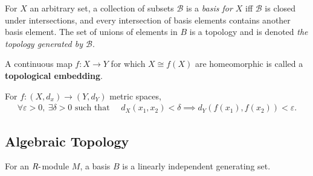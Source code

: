 \begin{definition}

For \(X\) an arbitrary set, a collection of subsets \({\mathcal{B}}\) is
a \emph{basis for \(X\)} iff \({\mathcal{B}}\) is closed under
intersections, and every intersection of basis elements contains another
basis element. The set of unions of elements in \(B\) is a topology and
is denoted \emph{the topology generated by \({\mathcal{B}}\)}.

\end{definition}

\begin{definition}

A continuous map \(f:X \to Y\) for which \(X\cong f(X)\) are
homeomorphic is called a \textbf{topological embedding}.

\end{definition}

\begin{definition}

For \(f: (X, d_{x}) \to (Y, d_{Y})\) metric spaces,
\begin{align*}
\forall \varepsilon> 0, ~\exists \delta > 0 \text{ such that } \quad d_{X}(x_{1}, x_{2}) < \delta \implies d_{Y}(f(x_{1}), f(x_{2})) < \varepsilon
.\end{align*}

\end{definition}

\hypertarget{algebraic-topology}{%
\subsection{Algebraic Topology}\label{algebraic-topology}}

\begin{definition}[Acyclic]

\end{definition}


\begin{definition}

\end{definition}


\begin{definition}[Basis]

For an \(R{\hbox{-}}\)module \(M\), a basis \(B\) is a linearly
independent generating set.

\end{definition}

